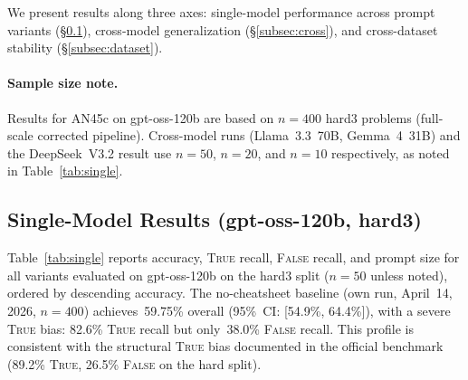 \documentclass[11pt]{article}
\begin{document}
We present results along three axes: single-model performance across
prompt variants (\S\ref{subsec:single}), cross-model generalization
(\S\ref{subsec:cross}), and cross-dataset stability
(\S\ref{subsec:dataset}).

\paragraph{Sample size note.}
Results for AN45c on gpt-oss-120b are based on $n=400$ hard3
problems (full-scale corrected pipeline). Cross-model runs
(Llama~3.3~70B, Gemma~4~31B) and the DeepSeek~V3.2 result
use $n=50$, $n=20$, and $n=10$ respectively, as noted in
Table~\ref{tab:single}.

\subsection{Single-Model Results (gpt-oss-120b, hard3)}
\label{subsec:single}

Table~\ref{tab:single} reports accuracy, \textsc{True} recall,
\textsc{False} recall, and prompt size for all variants evaluated on
gpt-oss-120b on the hard3 split ($n=50$ unless noted), ordered by
descending accuracy. The no-cheatsheet baseline (own run, April~14,
2026, $n=400$) achieves~59.75\% overall (95\%~CI: [54.9\%, 64.4\%]),
with a severe \textsc{True} bias: 82.6\% \textsc{True} recall but
only~38.0\% \textsc{False} recall. This profile is consistent with
the structural \textsc{True} bias documented in the official benchmark
(89.2\% \textsc{True}, 26.5\% \textsc{False} on the hard split).
\end{document}
